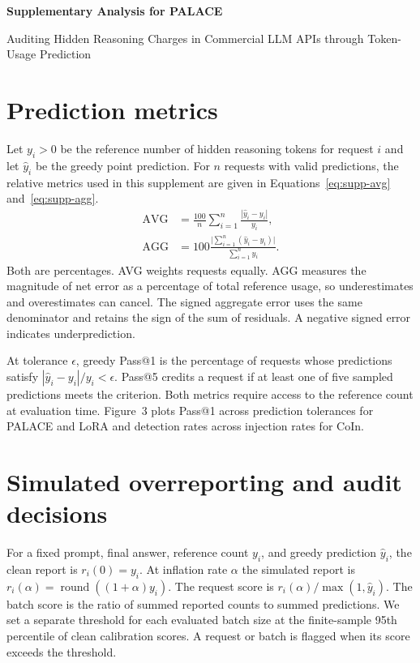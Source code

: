 \documentclass[11pt]{article}
\begin{document}
\begin{center}
{\Large\bfseries Supplementary Analysis for PALACE\par}
\smallskip
Auditing Hidden Reasoning Charges in Commercial LLM APIs through Token-Usage Prediction
\end{center}
\appendix
\renewcommand{\thetable}{S\arabic{table}}
\renewcommand{\theequation}{S\arabic{equation}}
\section{Prediction metrics}
\label{app:metrics}
Let \(y_i>0\) be the reference number of hidden reasoning tokens for request \(i\) and let \(\hat y_i\) be the greedy point prediction. For \(n\) requests with valid predictions, the relative metrics used in this supplement are given in Equations~\eqref{eq:supp-avg} and~\eqref{eq:supp-agg}.
\begin{align}
\mathrm{AVG} &= \frac{100}{n}\sum_{i=1}^n \frac{|\hat y_i-y_i|}{y_i},\label{eq:supp-avg}\\
\mathrm{AGG} &= 100\frac{\big|\sum_{i=1}^n(\hat y_i-y_i)\big|}{\sum_{i=1}^n y_i}.\label{eq:supp-agg}
\end{align}
Both are percentages. AVG weights requests equally. AGG measures the magnitude of net error as a percentage of total reference usage, so underestimates and overestimates can cancel. The signed aggregate error uses the same denominator and retains the sign of the sum of residuals. A negative signed error indicates underprediction.

At tolerance \(\epsilon\), greedy Pass@1 is the percentage of requests whose predictions satisfy \(|\hat y_i-y_i|/y_i<\epsilon\). Pass@5 credits a request if at least one of five sampled predictions meets the criterion. Both metrics require access to the reference count at evaluation time. Figure~3 plots Pass@1 across prediction tolerances for PALACE and LoRA and detection rates across injection rates for CoIn.

\section{Simulated overreporting and audit decisions}
\label{app:protocol}
For a fixed prompt, final answer, reference count \(y_i\), and greedy prediction \(\hat y_i\), the clean report is \(r_i(0)=y_i\). At inflation rate \(\alpha\) the simulated report is \(r_i(\alpha)=\operatorname{round}((1+\alpha)y_i)\). The request score is \(r_i(\alpha)/\max(1,\hat y_i)\). The batch score is the ratio of summed reported counts to summed predictions. We set a separate threshold for each evaluated batch size at the finite-sample 95th percentile of clean calibration scores. A request or batch is flagged when its score exceeds the threshold.
\end{document}
